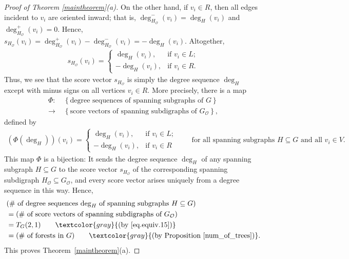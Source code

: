 \documentclass[12pt]{article}
\theoremstyle{definition}
\theoremstyle{remark}
\newcommand{\set}[1]{\left\{ #1 \right\}}
\newcommand{\tup}[1]{\left( #1 \right)}
\newcommand{\Or}{\mathcal{O}}
\begin{document}
\begin{proof}[Proof of Theorem \ref{maintheorem}(a)]
    On the other hand, if $v_i \in R$, then all edges incident to $v_i$ are oriented inward; that is, $\deg_{H_{\mathcal{O}}}^-(v_i) = \deg_{H}(v_i)$ and $\deg_{H_{\mathcal{O}}}^+(v_i) = 0$. Hence, $s_{H_{\mathcal{O}}}(v_i) = \deg_{H_{\mathcal{O}}}^+(v_i)-\deg_{H_{\mathcal{O}}}^-(v_i) = -\deg_{H}(v_i)$.
    Altogether, \begin{align*}
        s_{H_{\mathcal{O}}}(v_i) = \begin{cases}
            \deg_H(v_i), & \text{if } v_i \in L; \\
            -\deg_{H}(v_i), & \text{if } v_i \in R.
         \end{cases}
    \end{align*} Thus, we see that the score vector $s_{H_{\mathcal{O}}}$ is simply the degree sequence $\deg_{H}$ except with minus signs on all vertices $v_i\in R$. More precisely, there is a map \begin{align*}
        \Phi: \ & \set{\text{degree sequences of spanning subgraphs of $G$}} \\
		\to & \set{\text{score vectors of spanning subdigraphs of $G_{\Or}$}},
	\end{align*}
	defined by
	\begin{align*}
		(\Phi(\deg_H))(v_i) = \begin{cases}
            \deg_H(v_i), & \text{if } v_i \in L; \\
            -\deg_H(v_i), & \text{if } v_i \in R
        \end{cases} 
		\qquad \text{for all spanning subgraphs } H \subseteq G \text{ and all } v_i \in V.
    \end{align*} This map $\Phi$ is a bijection: It sends the degree sequence $\deg_H$ of any spanning subgraph $H \subseteq G$ to the score vector $s_{H_\Or}$ of the corresponding spanning subdigraph $H_{\mathcal{O}} \subseteq G_{\mathcal{O}}$, and every score vector arises uniquely from a degree sequence in this way. Hence, %
	\begin{align*}
        & (\# \text{ of degree sequences $\deg_H$ of spanning subgraphs $H \subseteq G$}) \\
        &= (\# \text{ of score vectors of spanning subdigraphs of $G_{\mathcal{O}}$}) \\
        &= T_{G}(2,1) \qquad \textcolor{gray}{\tup{\text{by \eqref{eq.equiv.15}}}} \\
		&= (\# \text{ of forests in $G$}) \qquad \textcolor{gray}{\tup{\text{by Proposition \ref{num_of_trees}}}}.
    \end{align*}
	This proves Theorem~\ref{maintheorem}(a).
\end{proof}
\end{document}
